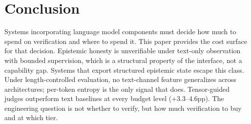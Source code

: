 \section{Conclusion}\label{sec:conclusion}

Systems incorporating language model components must decide how much to spend
on verification and where to spend it. This paper provides the cost surface
for that decision.
Epistemic honesty is unverifiable under text-only observation with bounded
supervision, which is a structural property of the interface, not a capability gap.
Systems that export structured epistemic state escape this class. Under
length-controlled evaluation, no text-channel feature generalizes across
architectures; per-token entropy is the only signal that does.
Tensor-guided judges outperform text baselines at every budget level
(+3.3--4.6pp). The engineering question is not whether to verify, but how
much verification to buy and at which tier.

